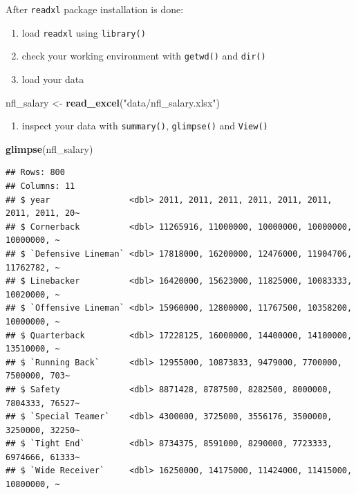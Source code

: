 \documentclass[
]{book}
\newenvironment{Shaded}{\begin{snugshade}}{\end{snugshade}}
\newcommand{\KeywordTok}[1]{\textcolor[rgb]{0.13,0.29,0.53}{\textbf{#1}}}
\newcommand{\NormalTok}[1]{#1}
\newcommand{\StringTok}[1]{\textcolor[rgb]{0.31,0.60,0.02}{#1}}
\providecommand{\tightlist}{%
  \setlength{\itemsep}{0pt}\setlength{\parskip}{0pt}}
\begin{document}
After \texttt{readxl} package installation is done:

\begin{enumerate}
\def\labelenumi{\arabic{enumi}.}
\item
  load \texttt{readxl} using \texttt{library()}
\item
  check your working environment with \texttt{getwd()} and \texttt{dir()}
\item
  load your data
\end{enumerate}

\begin{Shaded}
\begin{Highlighting}[]
\NormalTok{nfl_salary <-}\StringTok{ }\KeywordTok{read_excel}\NormalTok{(}\StringTok{"data/nfl_salary.xlsx"}\NormalTok{)}
\end{Highlighting}
\end{Shaded}

\begin{enumerate}
\def\labelenumi{\arabic{enumi}.}
\setcounter{enumi}{3}
\tightlist
\item
  inspect your data with \texttt{summary()}, \texttt{glimpse()} and \texttt{View()}
\end{enumerate}

\begin{Shaded}
\begin{Highlighting}[]
\KeywordTok{glimpse}\NormalTok{(nfl_salary)}
\end{Highlighting}
\end{Shaded}

\begin{verbatim}
## Rows: 800
## Columns: 11
## $ year                <dbl> 2011, 2011, 2011, 2011, 2011, 2011, 2011, 2011, 20~
## $ Cornerback          <dbl> 11265916, 11000000, 10000000, 10000000, 10000000, ~
## $ `Defensive Lineman` <dbl> 17818000, 16200000, 12476000, 11904706, 11762782, ~
## $ Linebacker          <dbl> 16420000, 15623000, 11825000, 10083333, 10020000, ~
## $ `Offensive Lineman` <dbl> 15960000, 12800000, 11767500, 10358200, 10000000, ~
## $ Quarterback         <dbl> 17228125, 16000000, 14400000, 14100000, 13510000, ~
## $ `Running Back`      <dbl> 12955000, 10873833, 9479000, 7700000, 7500000, 703~
## $ Safety              <dbl> 8871428, 8787500, 8282500, 8000000, 7804333, 76527~
## $ `Special Teamer`    <dbl> 4300000, 3725000, 3556176, 3500000, 3250000, 32250~
## $ `Tight End`         <dbl> 8734375, 8591000, 8290000, 7723333, 6974666, 61333~
## $ `Wide Receiver`     <dbl> 16250000, 14175000, 11424000, 11415000, 10800000, ~
\end{verbatim}
\end{document}
